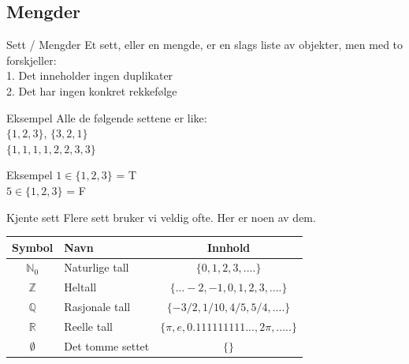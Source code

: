 \subsection{Mengder}
\begin{frame}{Sett / Mengder}
    Et sett, eller en mengde, er en slags liste av objekter, men med to forskjeller:\\
    \indent \hspace{3mm}    1. Det inneholder ingen duplikater\\
    \indent \hspace{3mm}    2. Det har ingen konkret rekkefølge
    
    \pause
    \begin{block}{Eksempel}
        Alle de følgende settene er like: \\
        $\{1, 2, 3\}$, $\{3, 2, 1\}$ \\
        $\{1, 1, 1, 1, 2, 2, 3, 3\}$
    \end{block}
    
    \pause
    \begin{block}{Eksempel}
        $1 \in \{1, 2, 3\}$ = T \\
        $5 \in \{1, 2, 3\}$ = F
    \end{block}
\end{frame}


\begin{frame}{Kjente sett}
    Flere sett bruker vi veldig ofte. Her er noen av dem.\\
    
    \begin{tabular}{c|l|c}
        Symbol & Navn & Innhold \\ \hline
        $\mathbb{N}_0$ & Naturlige tall & $\{0, 1, 2, 3, ....\}$\\
        $\mathbb{Z}$ & Heltall & $\{... -2, -1, 0, 1, 2, 3, ....\}$\\
        $\mathbb{Q}$ & Rasjonale tall & $\{-3/2, 1/10, 4/5, 5/4, ....\}$\\
        $\mathbb{R}$ & Reelle tall & $\{\pi, e, 0.111111111..., 2\pi, .....\}$\\
        $\emptyset$ & Det tomme settet & $\{\}$
    \end{tabular}
    
\end{frame}

